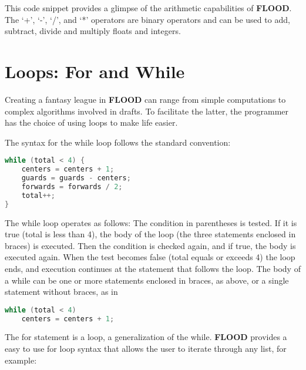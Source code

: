 \documentclass[12pt]{report}
\begin{document}
\begin{doublespace}
This code snippet provides a glimpse of the arithmetic capabilities of \textbf{FLOOD}. The `+', `-', `/', and `*' operators are binary operators and can be used to add, subtract, divide and multiply floats and integers.
\end{doublespace}

\section{Loops: For and While}

\begin{doublespace}
Creating a fantasy league in \textbf{FLOOD} can range from simple computations to complex algorithms involved in drafts. To facilitate the latter, the programmer has the choice of using loops to make life easier.

The syntax for the while loop follows the standard convention:
\end{doublespace}

\begin{lstlisting}[language=Java,label=some-code,caption=While loop]
while (total < 4) {
	centers = centers + 1;
	guards = guards - centers;
	forwards = forwards / 2;
	total++;
}
\end{lstlisting}

\begin{doublespace}
The while loop operates as follows: The condition in parentheses is tested. If it is true (total is less than 4), the body of the loop (the three statements enclosed in braces) is executed. Then the condition is checked again, and if true, the body is executed again. When the test becomes false (total equals or exceeds 4) the loop ends, and execution continues at the statement that follows the loop. The body of a while can be one or more statements enclosed in braces, as above, or a single statement without braces, as in
\end{doublespace}

\begin{lstlisting}[language=Java,label=some-code,caption=While loop]
while (total < 4)
	centers = centers + 1;
\end{lstlisting}

\begin{doublespace}
The for statement is a loop, a generalization of the while. \textbf{FLOOD} provides a easy to use for loop syntax that allows the user to iterate through any list, for example:
\end{doublespace}
\end{document}
